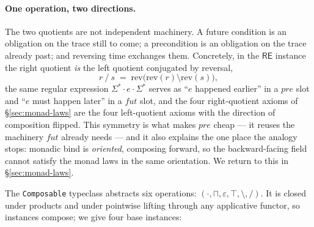 \documentclass[acmsmall,screen]{acmart}
\newcommand{\RE}{\mathsf{RE}}
\newcommand{\pre}{\mathit{pre}}
\newcommand{\fut}{\mathit{fut}}
\newcommand{\lquot}{\mathbin{\setminus}}   %
\newcommand{\rquot}{\mathbin{/}}           %
\begin{document}
\paragraph{One operation, two directions.}
The two quotients are not independent machinery.
A future condition is an obligation on the trace still to come; a
precondition is an obligation on the trace already past; and reversing time
exchanges them.
Concretely, in the $\RE$ instance the right quotient \emph{is} the left
quotient conjugated by reversal,
\[
  r \rquot s \;=\; \mathrm{rev}\bigl(\mathrm{rev}(r) \lquot \mathrm{rev}(s)\bigr),
\]
the same regular expression $\Sigma^* \cdot e \cdot \Sigma^*$ serves as
``$e$ happened earlier'' in a $\pre$ slot and ``$e$ must happen later'' in a
$\fut$ slot, and the four right-quotient axioms of \S\ref{sec:monad-laws}
are the four left-quotient axioms with the direction of composition flipped.
This symmetry is what makes $\pre$ cheap --- it reuses the machinery
$\fut$ already needs --- and it also explains the one place the analogy
stops: monadic bind is \emph{oriented}, composing forward, so the
backward-facing field cannot satisfy the monad laws in the same
orientation.
We return to this in \S\ref{sec:monad-laws}.

The \lstinline{Composable} typeclass abstracts six operations:
$(\cdot, \sqcap, \varepsilon, \top, \lquot, \rquot)$.
It is closed under products and under pointwise lifting through any
applicative functor, so instances compose;
we give four base instances:
\end{document}
